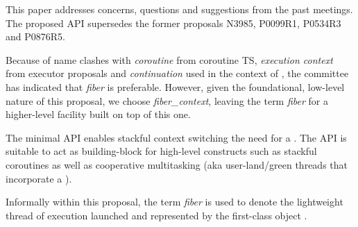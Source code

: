 \label{abstract}

This paper addresses concerns, questions and suggestions from the past meetings.
The proposed API supersedes the former proposals N3985\cite{N3985},
P0099R1\cite{P0099R1}, P0534R3\cite{P0534R3}
and P0876R5\cite{P0876R5}.

Because of name clashes with \emph{coroutine} from coroutine TS,
\emph{execution context} from executor proposals and \emph{continuation} used
in the context of , the committee has indicated
that \emph{fiber} is preferable. However, given the foundational, low-level
nature of this proposal, we choose \emph{fiber\_context}, leaving the
term \emph{fiber} for a higher-level facility built on top of this one.

The minimal API enables stackful context switching  the need for a
. The API is suitable to act as building-block for high-level
constructs such as stackful coroutines as well as cooperative multitasking
(aka user-land/green threads that incorporate a ).

Informally within this proposal, the term \emph{fiber} is used to denote the
lightweight thread of execution launched and represented by the first-class
object \fiber.
